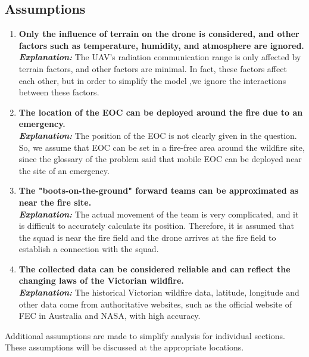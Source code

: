 \documentclass[12pt]{article}  %
\begin{document}
\subsection{Assumptions}
\begin{enumerate}
	\item \textbf{Only the influence of terrain on the drone is considered, and other factors such as temperature, humidity, and atmosphere are ignored.}\\
	\textbf{\textit{Explanation: }}The UAV's radiation communication range is only affected by terrain factors, and other factors are minimal. In fact, these factors affect each other, but in order to simplify the model ,we ignore the interactions between these factors.
	\item \textbf{The location of the EOC can be deployed around the fire due to an emergency.}\\
	\textbf{\textit{Explanation: }}The position of the EOC is not clearly given in the question. So, we assume that EOC can be set in a fire-free area around the wildfire site, since the glossary of the problem said that mobile EOC can be deployed near the site of an emergency.
	\item \textbf{The "boots-on-the-ground" forward teams can be approximated as near the fire site.}\\
	\textbf{\textit{Explanation: }}The actual movement of the team is very complicated, and it is difficult to accurately calculate its position. Therefore, it is assumed that the squad is near the fire field and the drone arrives at the fire field to establish a connection with the squad.
	\item \textbf{The collected data can be considered reliable and can reflect the changing laws of the Victorian wildfire.}\\
	\textbf{\textit{Explanation: }}The historical Victorian wildfire data, latitude, longitude and other data come from authoritative websites, such as the official website of FEC in Australia and NASA, with high accuracy.
\end{enumerate}
Additional assumptions are made to simplify analysis for individual sections. These assumptions will be discussed at the appropriate locations.




\end{document}
